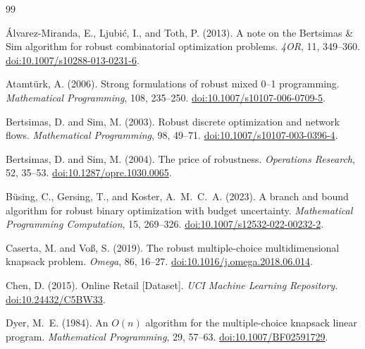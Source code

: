 \documentclass[11pt]{article}
\theoremstyle{plain}
\theoremstyle{definition}
\theoremstyle{remark}
\begin{document}
\begin{thebibliography}{99}
\footnotesize
\setlength{\bibsep}{0pt}

\'{A}lvarez-Miranda, E., Ljubi\'{c}, I., and Toth, P. (2013).
\newblock A note on the Bertsimas \& Sim algorithm for robust combinatorial optimization problems.
\newblock \emph{4OR}, 11, 349--360.
\newblock \href{https://doi.org/10.1007/s10288-013-0231-6}{doi:10.1007/s10288-013-0231-6}.

Atamt\"urk, A. (2006).
\newblock Strong formulations of robust mixed 0--1 programming.
\newblock \emph{Mathematical Programming}, 108, 235--250.
\newblock \href{https://doi.org/10.1007/s10107-006-0709-5}{doi:10.1007/s10107-006-0709-5}.

Bertsimas, D. and Sim, M. (2003).
\newblock Robust discrete optimization and network flows.
\newblock \emph{Mathematical Programming}, 98, 49--71.
\newblock \href{https://doi.org/10.1007/s10107-003-0396-4}{doi:10.1007/s10107-003-0396-4}.

Bertsimas, D. and Sim, M. (2004).
\newblock The price of robustness.
\newblock \emph{Operations Research}, 52, 35--53.
\newblock \href{https://doi.org/10.1287/opre.1030.0065}{doi:10.1287/opre.1030.0065}.

B\"using, C., Gersing, T., and Koster, A.~M.~C.~A. (2023).
\newblock A branch and bound algorithm for robust binary optimization with budget uncertainty.
\newblock \emph{Mathematical Programming Computation}, 15, 269--326.
\newblock \href{https://doi.org/10.1007/s12532-022-00232-2}{doi:10.1007/s12532-022-00232-2}.

Caserta, M. and Vo{\ss}, S. (2019).
\newblock The robust multiple-choice multidimensional knapsack problem.
\newblock \emph{Omega}, 86, 16--27.
\newblock \href{https://doi.org/10.1016/j.omega.2018.06.014}{doi:10.1016/j.omega.2018.06.014}.

Chen, D. (2015).
\newblock Online Retail [Dataset].
\newblock \emph{UCI Machine Learning Repository}.
\newblock \href{https://doi.org/10.24432/C5BW33}{doi:10.24432/C5BW33}.

Dyer, M.~E. (1984).
\newblock An $O(n)$ algorithm for the multiple-choice knapsack linear program.
\newblock \emph{Mathematical Programming}, 29, 57--63.
\newblock \href{https://doi.org/10.1007/BF02591729}{doi:10.1007/BF02591729}.


\end{thebibliography}
\end{document}
